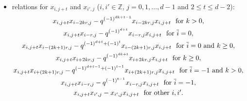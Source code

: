 \documentclass[reqno,12pt,a4paper]{amsart}
\theoremstyle{remark}
\theoremstyle{definition}
\numberwithin{equation}{section}
\begin{document}
\begin{itemize}
\item[(3)] relations for $x_{i,j+t}$ and $x_{i',j}$ ($i,i'\in\mathbb{Z}$, $j=0,1,\ldots,d-1$ and $2\leq t\leq d-2$):
  \begin{gather*}
 x_{i,j+t}x_{i-2kr,j}-q^{(-1)^{dk+t-1}}x_{i-2kr,j}x_{i,j+t} ~\hbox{ for } k>0,\\
x_{i,j+t}x_{i-r,j}-q^{(-1)^{d+t}} x_{i-r,j}x_{i,j+t} ~\hbox{ for $\overline{i}=0$},\\
x_{i,j+t}x_{i-(2k+1)r,j}-q^{(-1)^{d+t}+(-1)^t} x_{i-(2k+1)r,j}x_{i,j+t} ~\hbox{ for $\overline{i}=0$ and $k\geq 0$},\\
  x_{i,j+t}x_{i+2kr,j}-q^{(-1)^{dk+t}}x_{i+2kr,j}x_{i,j+t} ~\hbox{ for } k\geq0,\\
  x_{i,j+t}x_{i+(2k+1)r,j}-q^{(-1)^{d+t-1}+(-1)^{t-1}}x_{i+(2k+1)r,j}x_{i,j+t} ~\hbox{ for $\overline{i}=-1$ and $k>0$},\\
  x_{i,j+t}x_{i-r,j}-q^{(-1)^{t-1}} x_{i-r,j}x_{i,j+t} ~\hbox{ for $\overline{i}=-1$},\\
  x_{i,j+t}x_{i',j}-x_{i',j}x_{i,j+t} ~\hbox{ for other  $i,i'$}.
  \end{gather*}
\end{itemize}
\end{document}
